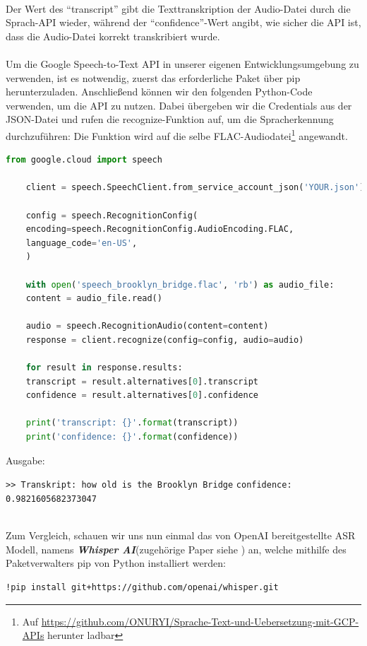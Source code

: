 \documentclass[12pt,a4paper]{article}
\begin{document}
\ \\
Der Wert des \enquote{transcript} gibt die Texttranskription der Audio-Datei durch die Sprach-API wieder, während der \enquote{confidence}-Wert angibt, wie sicher die API ist, dass die Audio-Datei korrekt transkribiert wurde. 
\\ \\ 
Um die Google Speech-to-Text API in unserer eigenen Entwicklungsumgebung zu verwenden, ist es notwendig, zuerst das erforderliche Paket über pip herunterzuladen. Anschließend können wir den folgenden Python-Code verwenden, um die API zu nutzen. Dabei übergeben wir die Credentials aus der JSON-Datei und rufen die recognize-Funktion auf, um die Spracherkennung durchzuführen:
Die Funktion wird auf die selbe FLAC-Audiodatei\footnote{Auf   \url{https://github.com/ONURYI/Sprache-Text-und-Uebersetzung-mit-GCP-APIs} herunter ladbar} angewandt.
\
\begin{lstlisting}[language=Python,numbers = none]
	from google.cloud import speech
	
	client = speech.SpeechClient.from_service_account_json('YOUR.json')
	
	config = speech.RecognitionConfig(
	encoding=speech.RecognitionConfig.AudioEncoding.FLAC,
	language_code='en-US',   
	)
	
	with open('speech_brooklyn_bridge.flac', 'rb') as audio_file:
	content = audio_file.read()
	
	audio = speech.RecognitionAudio(content=content)
	response = client.recognize(config=config, audio=audio)
	
	for result in response.results:
	transcript = result.alternatives[0].transcript
	confidence = result.alternatives[0].confidence
	
	print('transcript: {}'.format(transcript))
	print('confidence: {}'.format(confidence))
\end{lstlisting}
Ausgabe: 
\begin{center}
	\verb|>> Transkript: how old is the Brooklyn Bridge| 
	\verb|confidence: 0.9821605682373047|
\textit{}\end{center}
\  \\ 
Zum Vergleich, schauen wir uns nun einmal das von OpenAI bereitgestellte ASR Modell, namens \textbf{\textit{Whisper AI}}(zugehörige Paper siehe \cite{radford2022robust}) an, welche mithilfe des Paketverwalters pip von Python installiert werden:

\begin{verbatim}
!pip install git+https://github.com/openai/whisper.git 
\end{verbatim}
\end{document}
